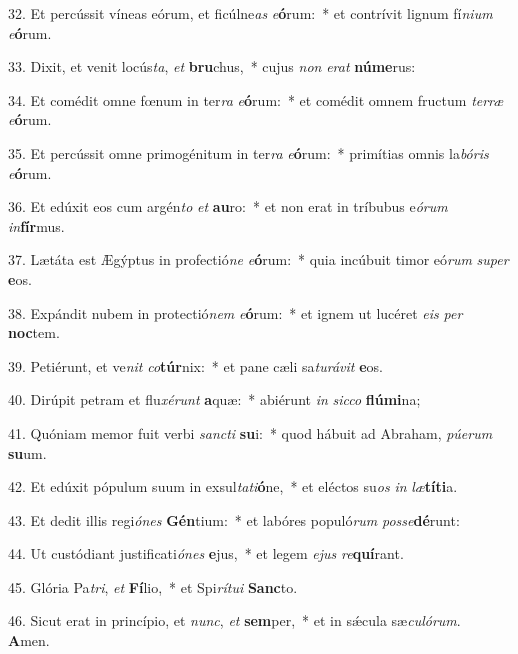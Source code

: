32. Et percússit víneas eórum, et ficúlne\textit{as} \textit{e}\textbf{ó}rum:~*  et contrívit lignum fí\textit{ni}\textit{um} \textit{e}\textbf{ó}rum.\

33. Dixit, et venit locús\textit{ta}, \textit{et} \textbf{bru}chus,~*  cujus \textit{non} \textit{e}\textit{rat} \textbf{nú}\textbf{me}rus:\

34. Et comédit omne fœnum in ter\textit{ra} \textit{e}\textbf{ó}rum:~*  et comédit omnem fructum \textit{ter}\textit{ræ} \textit{e}\textbf{ó}rum.\

35. Et percússit omne primogénitum in ter\textit{ra} \textit{e}\textbf{ó}rum:~*  primítias omnis la\textit{bó}\textit{ris} \textit{e}\textbf{ó}rum.\

36. Et edúxit eos cum argén\textit{to} \textit{et} \textbf{au}ro:~*  et non erat in tríbubus e\textit{ó}\textit{rum} \textit{in}\textbf{fír}mus.\

37. Lætáta est Ægýptus in profectió\textit{ne} \textit{e}\textbf{ó}rum:~*  quia incúbuit timor eó\textit{rum} \textit{su}\textit{per} \textbf{e}os.\

38. Expándit nubem in protectió\textit{nem} \textit{e}\textbf{ó}rum:~*  et ignem ut lucéret \textit{e}\textit{is} \textit{per} \textbf{noc}tem.\

39. Petiérunt, et ve\textit{nit} \textit{co}\textbf{túr}nix:~*  et pane cæli sa\textit{tu}\textit{rá}\textit{vit} \textbf{e}os.\

40. Dirúpit petram et flu\textit{xé}\textit{runt} \textbf{a}quæ:~*  abiérunt \textit{in} \textit{sic}\textit{co} \textbf{flú}\textbf{mi}na;\

41. Quóniam memor fuit verbi \textit{sanc}\textit{ti} \textbf{su}i:~*  quod hábuit ad Abraham, \textit{pú}\textit{e}\textit{rum} \textbf{su}um.\

42. Et edúxit pópulum suum in exsul\textit{ta}\textit{ti}\textbf{ó}ne,~*  et eléctos su\textit{os} \textit{in} \textit{læ}\textbf{tí}\textbf{ti}a.\

43. Et dedit illis regi\textit{ó}\textit{nes} \textbf{Gén}tium:~*  et labóres populó\textit{rum} \textit{pos}\textit{se}\textbf{dé}runt:\

44. Ut custódiant justificati\textit{ó}\textit{nes} \textbf{e}jus,~*  et legem \textit{e}\textit{jus} \textit{re}\textbf{quí}rant.\

45. Glória Pa\textit{tri}, \textit{et} \textbf{Fí}lio,~*  et Spi\textit{rí}\textit{tu}\textit{i} \textbf{Sanc}to.\

46. Sicut erat in princípio, et \textit{nunc}, \textit{et} \textbf{sem}per,~*  et in sǽcula sæ\textit{cu}\textit{ló}\textit{rum}. \textbf{A}men.\

